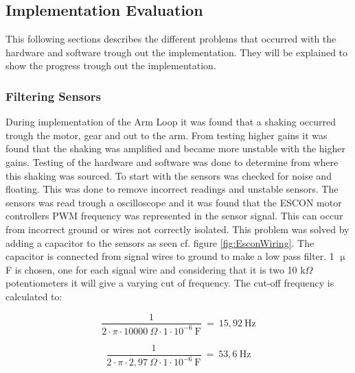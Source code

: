 \subsection{Implementation Evaluation}
This following sections describes the different problems that occurred with the hardware and software trough out the implementation. They will be explained to show the progress trough out the implementation.
\\
\subsubsection{Filtering Sensors}
During implementation of the Arm Loop it was found that a shaking occurred trough the motor, gear and out to the arm. From testing higher gains it was found that the shaking was amplified and became more unstable with the higher gains. Testing of the hardware and software was done to determine from where this shaking was sourced. To start with the sensors was checked for noise and floating. This was done to remove incorrect readings and unstable sensors. The sensors was read trough a oscilloscope and it was found that the ESCON motor controllers PWM frequency was represented in the sensor signal. This can occur from incorrect ground or wires not correctly isolated. This problem was solved by adding a capacitor to the sensors as seen cf. figure \ref{fig:EsconWiring}. The capacitor is connected from signal wires to ground to make a low pass filter. 1 $\upmu$F is chosen, one for each signal wire and considering that it is two 10 k$\Omega$ potentiometers it will give a varying cut of frequency. The cut-off frequency is calculated to:       

\begin{equation}
\frac{1}{2\cdot \pi \cdot 10000\ \Omega \cdot 1 \cdot 10^{-6}\  \text{F}}\ =\ 15,92\ \text{Hz}
\end{equation}

\begin{equation}
\frac{1}{2\cdot \pi \cdot 2,97\ \Omega \cdot 1 \cdot 10^{-6}\  \text{F}}\ =\ 53,6\ \text{Hz}
\end{equation}

